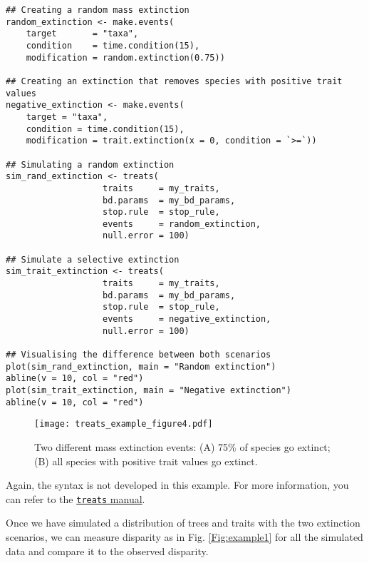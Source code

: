 \documentclass[12pt,letterpaper]{article}
\newcommand{\treats}{\texttt{treats} }
\begin{document}
\begin{lstlisting}
## Creating a random mass extinction
random_extinction <- make.events(
    target       = "taxa",
    condition    = time.condition(15),
    modification = random.extinction(0.75))

## Creating an extinction that removes species with positive trait values
negative_extinction <- make.events(
    target = "taxa",
    condition = time.condition(15),
    modification = trait.extinction(x = 0, condition = `>=`))

## Simulating a random extinction
sim_rand_extinction <- treats(
                   traits     = my_traits,
                   bd.params  = my_bd_params,
                   stop.rule  = stop_rule,
                   events     = random_extinction,
                   null.error = 100)

## Simulate a selective extinction
sim_trait_extinction <- treats(
                   traits     = my_traits,
                   bd.params  = my_bd_params,
                   stop.rule  = stop_rule,
                   events     = negative_extinction,
                   null.error = 100)

## Visualising the difference between both scenarios
plot(sim_rand_extinction, main = "Random extinction")
abline(v = 10, col = "red")
plot(sim_trait_extinction, main = "Negative extinction")
abline(v = 10, col = "red")
\end{lstlisting}

\begin{figure}[!htbp]
\centering
   \texttt{[image: treats\_example\_figure4.pdf]} 
\caption{Two different mass extinction events: (A) 75\% of species go extinct; (B) all species with positive trait values go extinct.}
\label{Fig:example4}
\end{figure}

Again, the syntax is not developed in this example.
For more information, you can refer to the \href{http://tguillerme.github.io/treats.htm}{\treats manual}.

Once we have simulated a distribution of trees and traits with the two extinction scenarios, we can measure disparity as in Fig. \ref{Fig:example1} for all the simulated data and compare it to the observed disparity.
\end{document}

